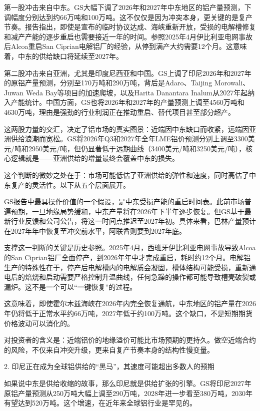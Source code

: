 \documentclass[11pt]{ctexart}
\begin{document}
第一股冲击来自中东。GS大幅下调了2026年和2027年中东地区的铝产量预测，下调幅度分别达到约66万吨和100万吨。这不仅仅是因为冲突本身，更关键的是复产节奏。报告指出，即使是宣布的临时协议达成、海峡重新开放，受损的电解槽修复和减产产能的逐步重启也需要接近一年的时间。参照2025年4月伊比利亚电网事故后Alcoa重启San Ciprian电解铝厂的经验，从停到满产大约需要12个月。这意味着，中东的供给缺口将延续至2027年。

第二股冲击来自亚洲，尤其是印度尼西亚和中国。GS上调了印尼2026年和2027年的原铝产量预测，分别至170万吨和290万吨，背后是Adaro、Taijing Morowali、Juwan Weda Bay等项目的加速爬坡，以及Harita Danantara Inalum从2027年起纳入产能统计。中国方面，GS也将2026年和2027年的产量预测上调至4560万吨和4630万吨，理由是强劲的行业利润正在推动重启、替代项目甚至部分超产。

这两股力量的交汇，决定了铝市场的真实图景：近端因中东缺口而收紧，远端因亚洲供给浪潮而宽松。GS将2026年Q3和2027年全年LME铝价预测分别上调至3300美元/吨和2950美元/吨，但仍显著低于远期曲线（3400美元/吨和3250美元/吨），核心逻辑就是——亚洲供给的增量最终会覆盖中东的损失。

这个判断的微妙之处在于：市场可能低估了亚洲供给的弹性和速度，同时高估了中东复产的灵活性。以下从五个层面展开。

GS报告中最具操作价值的一个假设，是中东受损产能的重启时间表。此前市场普遍预期，一旦地缘局势缓和，中东产量将在2026年下半年逐步恢复。但GS基于最新行业反馈和公司公告，将这一时间点推迟至2027年初。具体来看，巴林产量预计在2027年年中恢复至冲突前水平，阿联酋则要到2027年底。

支撑这一判断的关键是历史参照。2025年4月，西班牙伊比利亚电网事故导致Alcoa的San Ciprian铝厂全面停产，到2026年年中才完成重启，耗时约12个月。电解铝生产的特殊性在于，停产后电解槽内的电解质会凝固，槽体结构可能受损，重新通电后的焙烧和启动需要严格控制升温曲线，任何急躁的操作都可能导致槽壳破裂或漏炉。这不是一个可以“一键恢复”的过程。

这意味着，即使霍尔木兹海峡在2026年内完全恢复通航，中东地区的铝产量在2026年仍将低于正常水平约66万吨，2027年低于约100万吨。这个缺口，不是短期期货价格波动可以消化的。

对投资者的含义是：近端铝价的地缘溢价可能比市场预期的更持久。做空近端合约的风险，不仅来自冲突升级，更来自复产节奏本身的结构性慢变量。

2. 印尼正在成为全球铝供给的“黑马”，其速度可能超出多数人的预期

如果说中东是供给收缩的故事，那么印尼就是供给扩张的引擎。GS将印尼2027年原铝产量预测从250万吨大幅上调至290万吨，2028年进一步看至380万吨，2030年有望达到520万吨。这个增速，在近年来全球铝行业是罕见的。
\end{document}
